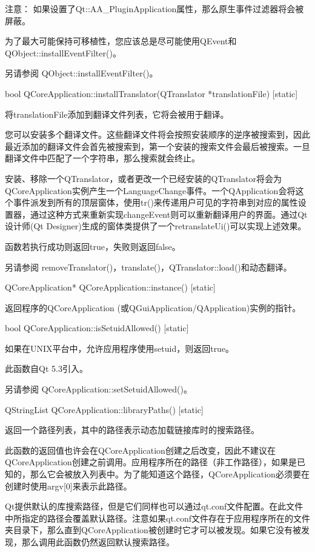 注意： 如果设置了Qt::AA\_PluginApplication属性，那么原生事件过滤器将会被屏蔽。

为了最大可能保持可移植性，您应该总是尽可能使用QEvent和QObject::installEventFilter()。

另请参阅 QObject::installEventFilter()。

bool QCoreApplication::installTranslator(QTranslator *translationFile) [static]

将translationFile添加到翻译文件列表，它将会被用于翻译。

您可以安装多个翻译文件。这些翻译文件将会按照安装顺序的逆序被搜索到，因此最近添加的翻译文件会首先被搜索到，第一个安装的搜索文件会最后被搜索。一旦翻译文件中匹配了一个字符串，那么搜索就会终止。

安装、移除一个QTranslator，或者更改一个已经安装的QTranslator将会为QCoreApplication实例产生一个LanguageChange事件。一个QApplication会将这个事件派发到所有的顶层窗体，使用tr()来传递用户可见的字符串到对应的属性设置器，通过这种方式来重新实现changeEvent则可以重新翻译用户的界面。通过Qt设计师(Qt Designer)生成的窗体类提供了一个retranslateUi()可以实现上述效果。

函数若执行成功则返回true，失败则返回false。

另请参阅 removeTranslator()，translate()，QTranslator::load()和动态翻译。

QCoreApplication* QCoreApplication::instance() [static]

返回程序的QCoreApplication (或QGuiApplication/QApplication)实例的指针。

bool QCoreApplication::isSetuidAllowed() [static]

如果在UNIX平台中，允许应用程序使用setuid，则返回true。

此函数自Qt 5.3引入。

另请参阅 QCoreApplication::setSetuidAllowed()。

QStringList QCoreApplication::libraryPaths() [static]

返回一个路径列表，其中的路径表示动态加载链接库时的搜索路径。

此函数的返回值也许会在QCoreApplication创建之后改变，因此不建议在QCoreApplication创建之前调用。应用程序所在的路径（非工作路径），如果是已知的，那么它会被放入列表中。为了能知道这个路径，QCoreApplication必须要在创建时使用argv[0]来表示此路径。

Qt提供默认的库搜索路径，但是它们同样也可以通过qt.conf文件配置。在此文件中所指定的路径会覆盖默认路径。注意如果qt.conf文件存在于应用程序所在的文件夹目录下，那么直到QCoreApplication被创建时它才可以被发现。如果它没有被发现，那么调用此函数仍然返回默认搜索路径。

